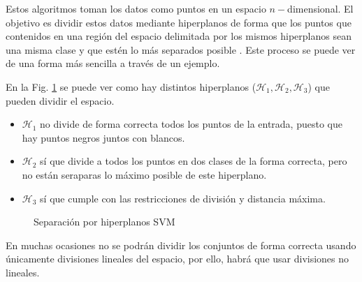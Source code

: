 Estos algoritmos toman los datos como puntos en un espacio $n-$dimensional. El objetivo es dividir estos datos mediante hiperplanos de forma que los puntos que contenidos en una región del espacio delimitada por los mismos hiperplanos sean una misma clase y que estén lo más separados posible \cite{cervantes2020comprehensive}. Este proceso se puede ver de una forma más sencilla a través de un ejemplo.

En la Fig. \ref{fig:svm_separation} se puede ver como hay distintos hiperplanos ($\mathcal{H}_1, \mathcal{H}_2, \mathcal{H}_3$) que pueden dividir el espacio. 

\begin{itemize}
    \item $\mathcal{H}_1$ no divide de forma correcta todos los puntos de la entrada, puesto que hay puntos negros juntos con blancos.
    \item $\mathcal{H}_2$ sí que divide a todos los puntos en dos clases de la forma correcta, pero no están seraparas lo máximo posible de este hiperplano.
    \item $\mathcal{H}_3$ sí que cumple con las restricciones de división y distancia máxima.
\end{itemize}

\begin{figure}[htpb!]
    \centering
    \caption{Separación por hiperplanos SVM \cite{svmseparation2012}}
    \label{fig:svm_separation}
\end{figure}

En muchas ocasiones no se podrán dividir los conjuntos de forma correcta usando únicamente divisiones lineales del espacio, por ello, habrá que usar divisiones no lineales.

